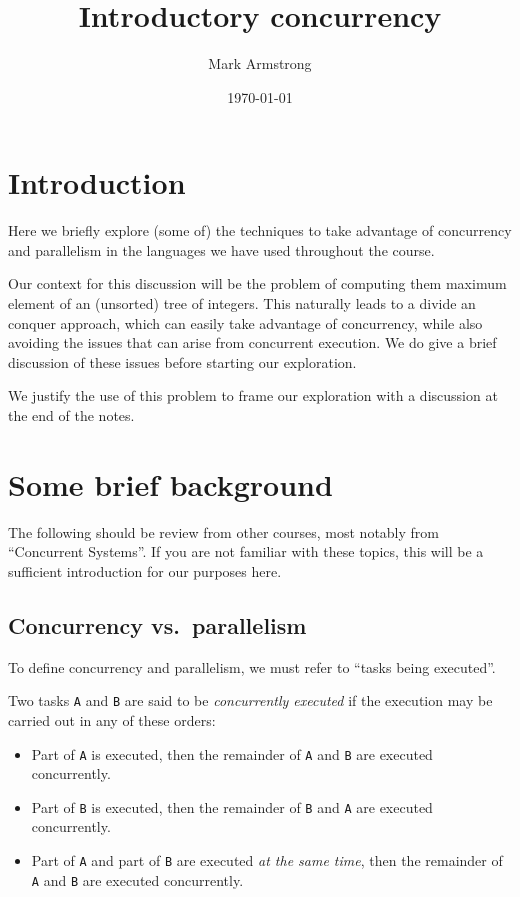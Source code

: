 \documentclass[11pt]{article}
\author{Mark Armstrong}
\date{\today}
\title{Introductory concurrency}
\begin{document}
\maketitle
\tableofcontents


\section{Introduction}
\label{sec:orge2e3b2a}
Here we briefly explore (some of) the techniques to take advantage
of concurrency and parallelism in the languages we have used
throughout the course.

Our context for this discussion will be the problem
of computing them maximum element of an (unsorted) tree of integers.
This naturally leads to a divide an conquer approach,
which can easily take advantage of concurrency,
while also avoiding the issues that can arise from concurrent execution.
We do give a brief discussion of these issues before
starting our exploration.

We justify the use of this problem to frame our exploration
with a discussion at the end of the notes.

\section{Some brief background}
\label{sec:org27eb38a}
The following should be review from other courses,
most notably from “Concurrent Systems”.
If you are not familiar with these topics,
this will be a sufficient introduction
for our purposes here.

\subsection{Concurrency vs. parallelism}
\label{sec:orgdc8b0a7}
To define concurrency and parallelism, we must refer to
“tasks being executed”.

Two tasks \texttt{A} and \texttt{B} are said to be \emph{concurrently executed} if
the execution may be carried out in any of these orders:
\begin{itemize}
\item Part of \texttt{A} is executed, then the remainder of \texttt{A} and \texttt{B} are
executed concurrently.
\item Part of \texttt{B} is executed, then the remainder of \texttt{B} and \texttt{A} are
executed concurrently.
\item Part of \texttt{A} and part of \texttt{B} are executed \emph{at the same time},
then the remainder of \texttt{A} and \texttt{B} are executed concurrently.
\end{itemize}
\end{document}
